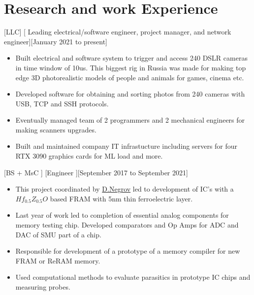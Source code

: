 \documentclass{article}
\begin{document}
\section{Research and work Experience}
 

 


[LLC]
[ Leading electrical/software engineer, project manager, and network engineer][January 2021 to present]
 
\begin{itemize}
   \item Built electrical and software system to trigger and access 240 DSLR cameras in time window of 10us. This biggest rig in Russia was made for making top edge 3D photorealistic models of people and animals for games, cinema etc.
   \item Developed software for obtaining and sorting photos from 240 cameras with USB, TCP and SSH protocols.
   \item Eventually managed team of 2 programmers and 2 mechanical engineers for making scanners upgrades.
   \item Built and maintained company IT infrastucture including servers for four RTX 3090 graphics cards for ML load and more.
   \end{itemize}

[BS + MsC ]
[Engineer ][September 2017 to September 2021]

\begin{itemize}
\item This project coordinated by  \href{https://www.scopus.com/authid/detail.uri?authorId=56272708000}{D.Negrov}   led to development of IC's with a $Hf_{0.5} Z_{0.5} O $ based  FRAM with 5nm thin ferroelectric layer.
\item Last year of work led to completion of essential analog components for memory testing chip. Developed comparators and Op Amps for ADC and DAC of SMU part of a chip.
\item Responsible for development of a prototype of a memory  compiler for new FRAM or ReRAM memory.
\item Used computational methods to evaluate parasitics in prototype IC chips and measuring probes.

\end{itemize}
 
\end{document}
